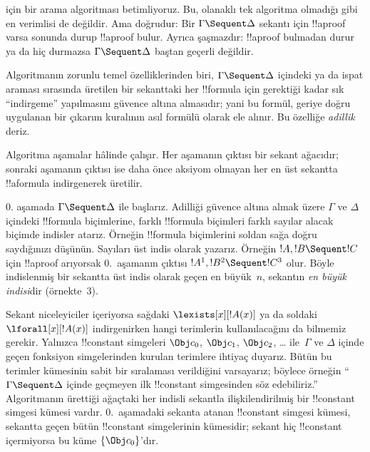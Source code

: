 \documentclass[../../../include/open-logic-section]{subfiles}
\begin{document}


 için bir arama algoritması betimliyoruz. Bu, olanaklı tek
algoritma olmadığı gibi en verimlisi de değildir. Ama doğrudur: Bir
$\Gamma \Sequent \Delta$ sekantı için !!a{proof} varsa sonunda durup
!!a{proof} bulur. Ayrıca şaşmazdır: !!a{proof} bulmadan durur ya da hiç
durmazsa $\Gamma \Sequent \Delta$ baştan geçerli değildir.

Algoritmanın zorunlu temel özelliklerinden biri, $\Gamma \Sequent \Delta$
içindeki ya da ispat araması sırasında üretilen bir sekanttaki her
!!{formula} için gerektiği kadar sık ``indirgeme'' yapılmasını güvence altına
almasıdır; yani bu formül, geriye doğru uygulanan bir çıkarım kuralının
asıl formülü olarak ele alınır. Bu özelliğe \emph{adillik} deriz.

Algoritma aşamalar hâlinde çalışır. Her aşamanın çıktısı bir sekant ağacıdır;
sonraki aşamanın çıktısı ise daha önce aksiyom olmayan her en üst sekantta
!!a{formula} indirgenerek üretilir.

$0$. aşamada $\Gamma \Sequent \Delta$ ile başlarız. Adilliği güvence altına
almak üzere $\Gamma$ ve $\Delta$ içindeki !!{formula} biçimlerine, farklı
!!{formula} biçimleri farklı sayılar alacak biçimde indisler atarız.
Örneğin !!{formula} biçimlerini soldan sağa doğru saydığınızı düşünün. Sayıları üst indis
olarak yazarız. Örneğin $!A, !B \Sequent !C$ için !!a{proof} arıyorsak
$0$.~aşamanın çıktısı $!A^1, !B^2 \Sequent !C^3$ olur. Böyle indislenmiş bir
sekantta üst indis olarak geçen en büyük~$n$, sekantın \emph{en büyük indisi}dir
(örnekte~$3$).

Sekant niceleyiciler içeriyorsa sağdaki $\lexists[x][!A(x)]$ ya da soldaki
$\lforall[x][!A(x)]$ indirgenirken hangi terimlerin kullanılacağını da
bilmemiz gerekir. Yalnızca !!{constant} simgeleri $\Obj c_0$, $\Obj c_1$, $\Obj c_2$,
\dots{} ile~$\Gamma$ ve $\Delta$ içinde geçen fonksiyon simgelerinden
kurulan terimlere ihtiyaç duyarız. Bütün bu terimler kümesinin sabit bir
sıralaması verildiğini varsayarız; böylece örneğin ``$\Gamma \Sequent
\Delta$ içinde geçmeyen ilk !!{constant} simgesinden söz edebiliriz.'' Algoritmanın
ürettiği ağaçtaki her indisli sekantla ilişkilendirilmiş bir !!{constant}
simgesi kümesi vardır. $0$.~aşamadaki sekanta atanan !!{constant} simgesi kümesi, sekantta
geçen bütün !!{constant} simgelerinin kümesidir; sekant hiç !!{constant} içermiyorsa bu
küme $\{\Obj c_0\}$'dır.
\end{document}
